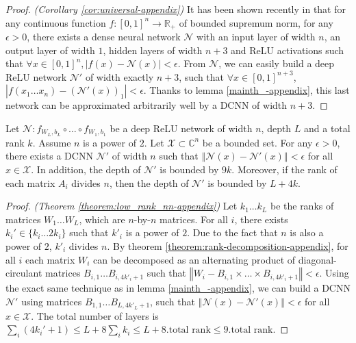 \begin{proof} \emph{(Corollary \ref{cor:universal-appendix})}
It has been shown recently in \cite{hanin2017universal} that for any continuous function $f:[0,1]^{n}\rightarrow\mathbb{R}_+$ of bounded supremum norm, for any $\epsilon>0$, there exists a dense neural network $\mathcal{N}$ with an input layer of width $n$, an output layer of width $1$, hidden layers of width $n+3$ and ReLU activations such that $\forall x\in[0,1]^n, \left|f(x)-\mathcal{N}\left(x\right)\right|<\epsilon$. From $\mathcal{N}$, we can easily build a deep ReLU network $\mathcal{N'}$ of width exactly $n+3$, such that $\forall x\in[0,1]^{n+3}$, $\left|f(x_{1}\ldots x_{n})-\left(\mathcal{N}'\left(x\right)\right)_{1}\right|<\epsilon$. Thanks to lemma \ref{mainth_-appendix}, this last network can be approximated arbitrarily well by a DCNN of width $n+3$.
\end{proof}

\begin{theorem} \label{theorem:low_rank_nn-appendix}
Let $\mathcal{N}:f_{W_{L},b_{L}} \circ \ldots \circ f_{W_{1},b_{1}}$ be a deep ReLU network of width $n$, depth $L$ and a total rank $k$.
Assume $n$ is a power of $2$.
Let $\mathcal{X} \subset \mathbb{C}^{n}$ be a bounded set.
For any $\epsilon>0$, there exists a DCNN $\mathcal{N}'$ of width $n$ such that $\left\Vert \mathcal{N}(x)-\mathcal{N}'(x)\right\Vert <\epsilon$ for all $x\in\mathcal{X}$.
In addition, the depth of $\mathcal{N}'$ is bounded by $9k$.
Moreover, if the rank of each matrix $A_i$ divides $n$, then the depth of $\mathcal{N}'$ is bounded by $L+4k$.
\end{theorem}

\begin{proof} \emph{(Theorem \ref{theorem:low_rank_nn-appendix})}
Let $k_{1}\ldots k_{L}$ be the ranks of matrices $W_{1}\ldots W_{L}$, which are $n$-by-$n$ matrices.
For all $i$, there exists $k_{i}'\in\{k_{i}\ldots2k_{i}\}$ such that $k'_{i}$ is a power of $2$.
Due to the fact that $n$ is also a power of $2$, $k'_{i}$ divides $n$.
By theorem \ref{theorem:rank-decomposition-appendix}, for all $i$ each matrix $W_{i}$ can be decomposed as an alternating product of diagonal-circulant matrices $B_{i,1}\ldots B_{i,4k'_{i}+1}$ such that $\left\Vert W_{i}-B_{i,1}\times\ldots\times B_{i,4k'_{i}+1}\right\Vert <\epsilon$.
Using the exact same technique as in lemma \ref{mainth_-appendix}, we can build a DCNN $\mathcal{N}'$ using matrices $B_{1,1}\ldots B_{L,4k'_{L}+1}$, such that $\left\Vert \mathcal{N}(x)-\mathcal{N}'(x)\right\Vert <\epsilon$ for all $x\in\mathcal{X}$.
The total number of layers is $\sum_{i}\left(4k_{i}'+1\right)\le L+8\sum_{i}k_{i}\le L+8.
\textrm{total rank} \le 9.\textrm{total rank}$.
\end{proof}

